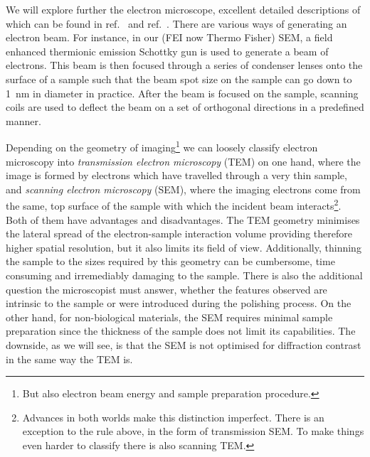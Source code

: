 We will explore further the electron microscope, excellent detailed descriptions of which can be found in ref.~\cite{Hearle72} and ref.~\cite{reimerSEM}. There are various ways of generating an electron beam. For instance, in our (FEI now Thermo Fisher) SEM, a field enhanced thermionic emission Schottky gun is used to generate a beam of electrons. This beam is then focused through a series of condenser lenses onto the surface of a sample such that the beam spot size on the sample can go down to  \SI{1}{\nano \meter} in diameter in practice.  After the beam is focused on the sample, scanning coils are used to deflect the beam on a set of orthogonal directions in a predefined manner. 

Depending on the geometry of imaging\footnote{ But also electron beam energy and sample preparation procedure.} we can loosely classify electron microscopy into \textit{transmission electron microscopy} (TEM) on one hand, where the image is formed by electrons which have travelled through a very thin sample, and \textit{scanning electron microscopy} (SEM), where the imaging electrons come from the same, top surface of the sample with which the incident beam interacts\footnote{ Advances in both worlds make this distinction imperfect. There is an exception to the rule above, in the form of transmission SEM. To make things even harder to classify there is also scanning TEM.}. Both of them have advantages and disadvantages. The TEM geometry minimises the lateral spread of the electron-sample interaction volume providing therefore higher spatial resolution, but it also limits its field of view. Additionally, thinning the sample to the sizes required by this geometry can be cumbersome, time consuming and irremediably damaging to the sample. There is also the additional question the microscopist must answer, whether the features observed are intrinsic to the sample or were introduced during the polishing process. On the other hand, for non-biological materials, the SEM requires minimal sample preparation since the thickness of the sample does not limit its capabilities. The downside, as we will see, is that the SEM is not optimised for diffraction contrast in the same way the TEM is. 


